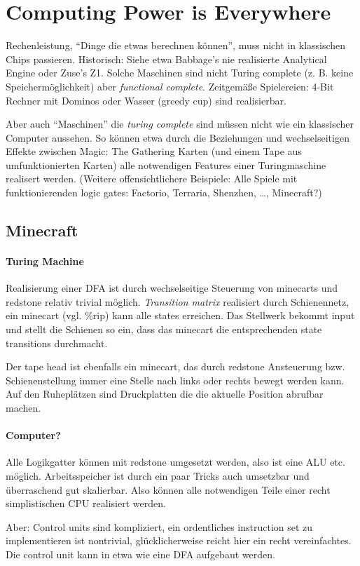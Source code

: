 \documentclass{article}
\begin{document}
\section*{Computing Power is Everywhere}

Rechenleistung, \enquote{Dinge die etwas berechnen können}, muss nicht in klassischen Chips passieren. Historisch: Siehe etwa Babbage's nie realisierte Analytical Engine oder Zuse's Z1. Solche Maschinen sind nicht Turing complete (z. B. keine Speichermöglichkeit) aber \emph{functional complete}. Zeitgemäße Spielereien: 4-Bit Rechner mit Dominos oder Wasser (greedy cup) sind realisierbar.

Aber auch \enquote{Maschinen} die \emph{turing complete} sind müssen nicht wie ein klassischer Computer aussehen. So können etwa durch die Beziehungen und wechselseitigen Effekte zwischen Magic: The Gathering Karten (und einem Tape aus umfunktionierten Karten) alle notwendigen Features einer Turingmaschine realisert werden. (Weitere offensichtlichere Beispiele: Alle Spiele mit funktionierenden logic gates: Factorio, Terraria, Shenzhen, \ldots, Minecraft?)

\subsection*{Minecraft}

\paragraph{Turing Machine}

Realisierung einer DFA ist durch wechselseitige Steuerung von minecarts und redstone relativ trivial möglich. \emph{Transition matrix} realisiert durch Schienennetz, ein minecart (vgl. \%rip) kann alle states erreichen. Das Stellwerk bekommt input und stellt die Schienen so ein, dass das minecart die entsprechenden state transitions durchmacht.

Der tape head ist ebenfalls ein minecart, das durch redstone Ansteuerung bzw. Schienenstellung immer eine Stelle nach links oder rechts bewegt werden kann. Auf den Ruheplätzen sind Druckplatten die die aktuelle Position abrufbar machen.

\paragraph{Computer?} Alle Logikgatter können mit redstone umgesetzt werden, also ist eine ALU etc. möglich. Arbeitsspeicher ist durch ein paar Tricks auch umsetzbar und überraschend gut skalierbar. Also können alle notwendigen Teile einer recht simplistischen CPU realisiert werden.

Aber: Control units sind kompliziert, ein ordentliches instruction set zu implementieren ist nontrivial, glücklicherweise reicht hier ein recht vereinfachtes. Die control unit kann in etwa wie eine DFA aufgebaut werden.
\end{document}
